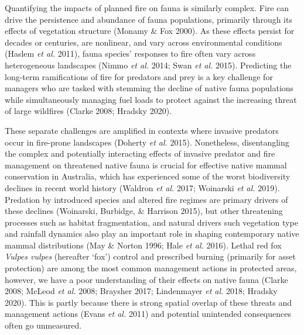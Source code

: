 \documentclass[]{elsarticle} %
\begin{document}
Quantifying the impacts of planned fire on fauna is similarly complex. Fire can drive the persistence and abundance of fauna populations, primarily through its effects of vegetation structure (Monamy \& Fox 2000). As these effects persist for decades or centuries, are nonlinear, and vary across environmental conditions (Haslem \emph{et al.} 2011), fauna species' responses to fire often vary across heterogeneous landscapes (Nimmo \emph{et al.} 2014; Swan \emph{et al.} 2015). Predicting the long-term ramifications of fire for predators and prey is a key challenge for managers who are tasked with stemming the decline of native fauna populations while simultaneously managing fuel loads to protect against the increasing threat of large wildfires (Clarke 2008; Hradsky 2020).

These separate challenges are amplified in contexts where invasive predators occur in fire-prone landscapes (Doherty \emph{et al.} 2015). Nonetheless, disentangling the complex and potentially interacting effects of invasive predator and fire management on threatened native fauna is crucial for effective native mammal conservation in Australia, which has experienced some of the worst biodiversity declines in recent world history (Waldron \emph{et al.} 2017; Woinarski \emph{et al.} 2019). Predation by introduced species and altered fire regimes are primary drivers of these declines (Woinarski, Burbidge, \& Harrison 2015), but other threatening processes such as habitat fragmentation, and natural drivers such vegetation type and rainfall dynamics also play an important role in shaping contemporary native mammal distributions (May \& Norton 1996; Hale \emph{et al.} 2016). Lethal red fox \emph{Vulpes vulpes} (hereafter `fox') control and prescribed burning (primarily for asset protection) are among the most common management actions in protected areas, however, we have a poor understanding of their effects on native fauna (Clarke 2008; McLeod \emph{et al.} 2008; Braysher 2017; Lindenmayer \emph{et al.} 2018; Hradsky 2020). This is partly because there is strong spatial overlap of these threats and management actions (Evans \emph{et al.} 2011) and potential unintended consequences often go unmeasured.
\end{document}
